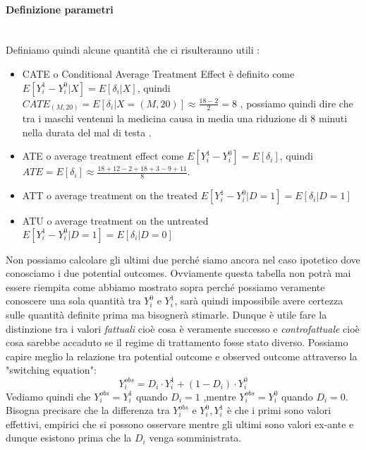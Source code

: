 \paragraph{Definizione parametri} \hspace{0pt} \\
\label{parag:param}
Definiamo quindi alcune quantità che ci risulteranno utili : 
\begin{itemize}
\item CATE o Conditional Average Treatment Effect è definito come $E[Y^{1}_i- Y^{0}_i|X] = E[\delta_i|X]$, quindi $CATE_{(M,20)}=E[\delta_i|X=(M,20)] \approx \frac{18-2}{2}=8$ , possiamo quindi dire che tra i maschi ventenni la medicina causa in media una riduzione di 8 minuti nella durata del mal di testa .
\item ATE o average treatment effect come  $E[Y^{1}_i- Y^{0}_i] = E[\delta_i]$, quindi $ATE= E[\delta_i] \approx \frac{18+12-2+18+3-9+11}{8}$.

\item ATT o average treatment on the treated $E[Y^{1}_i- Y^{0}_i|D=1] = E[\delta_i|D=1]$ 

\item ATU o average treatment on the untreated
$E[Y^{1}_i- Y^{0}_i|D=1] = E[\delta_i|D=0]$
\end{itemize}
 
Non possiamo calcolare gli ultimi due perché siamo ancora nel caso ipotetico dove conosciamo i due potential outcomes.
Ovviamente questa tabella non potrà mai essere riempita come abbiamo mostrato sopra perché possiamo veramente conoscere una sola quantità tra $Y^0_{i}$ e $Y^1_{i}$, sarà quindi impossibile avere certezza sulle quantità definite prima ma bisognerà stimarle. 
Dunque è utile fare la distinzione tra i valori \textit{fattuali} cioè cosa è veramente successo e \textit{controfattuale} cioè cosa sarebbe accaduto se il regime di trattamento fosse stato diverso.
Possiamo capire meglio la relazione tra potential outcome e observed outcome attraverso la  "switching equation": 
\begin{equation}
Y_i^{obs} = D_i \cdot Y^1_i + (1-D_i) \cdot Y^0_i
\label{eq:switching}
\end{equation}
Vediamo quindi che $Y_i^{obs} = Y^1_i$ quando $D_i =1$ ,mentre $Y_i^{obs} = Y^0_i$ quando $D_i = 0$. 
Bisogna precisare che la differenza tra $Y_i^{obs}$ e $Y^0_i,Y^1_i$ è che i primi sono valori effettivi, empirici che si possono osservare mentre gli ultimi sono valori ex-ante e dunque esistono prima che la $D_i$ venga somministrata.


